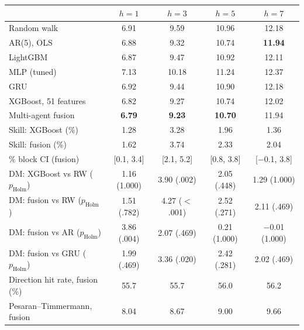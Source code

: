 \begin{tabular}{lcccc}
\toprule
 & $h{=}1$ & $h{=}3$ & $h{=}5$ & $h{=}7$\\
\midrule
Random walk & 6.91 & 9.59 & 10.96 & 12.18\\
AR(5), OLS & 6.88 & 9.32 & 10.74 & \textbf{11.94}\\
LightGBM & 6.87 & 9.47 & 10.92 & 12.11\\
MLP (tuned) & 7.13 & 10.18 & 11.24 & 12.37\\
GRU & 6.92 & 9.44 & 10.90 & 12.18\\
XGBoost, 51 features & 6.82 & 9.27 & 10.74 & 12.02\\
Multi-agent fusion & \textbf{6.79} & \textbf{9.23} & \textbf{10.70} & 11.94\\
\midrule
Skill: XGBoost (\%) & 1.28 & 3.28 & 1.96 & 1.36\\
Skill: fusion (\%) & 1.62 & 3.74 & 2.33 & 2.04\\
\quad 95\% block CI (fusion) & [0.1, 3.4] & [2.1, 5.2] & [0.8, 3.8] & [$-$0.1, 3.8]\\
DM: XGBoost vs RW ($p_{\text{Holm}}$) & 1.16 (1.000) & 3.90 (.002) & 2.05 (.448) & 1.29 (1.000)\\
DM: fusion vs RW ($p_{\text{Holm}}$) & 1.51 (.782) & 4.27 ($<$.001) & 2.52 (.271) & 2.11 (.469)\\
DM: fusion vs AR ($p_{\text{Holm}}$) & 3.86 (.004) & 2.07 (.469) & 0.21 (1.000) & $-$0.01 (1.000)\\
DM: fusion vs GRU ($p_{\text{Holm}}$) & 1.99 (.469) & 3.36 (.020) & 2.42 (.281) & 2.02 (.469)\\
Direction hit rate, fusion (\%) & 55.7 & 55.7 & 56.0 & 56.2\\
Pesaran--Timmermann, fusion & 8.04 & 8.67 & 9.00 & 9.66\\
\bottomrule
\end{tabular}
